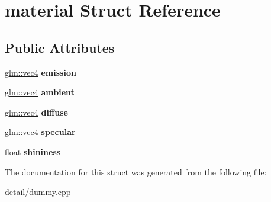 \hypertarget{structmaterial}{\section{material Struct Reference}
\label{structmaterial}
}
\subsection*{Public Attributes}
\begin{DoxyCompactItemize}
\item 
\hypertarget{structmaterial_a76b696726a2ea73e6840001821942bc3}{\hyperlink{group__core__types_ga5881b1b022d7fd1b7218f5916532dd02}{glm\-::vec4} {\bfseries emission}}\label{structmaterial_a76b696726a2ea73e6840001821942bc3}

\item 
\hypertarget{structmaterial_a944296102e90b1610967530458f40ba1}{\hyperlink{group__core__types_ga5881b1b022d7fd1b7218f5916532dd02}{glm\-::vec4} {\bfseries ambient}}\label{structmaterial_a944296102e90b1610967530458f40ba1}

\item 
\hypertarget{structmaterial_a506a0cc33282fa76872c6aeebd688b39}{\hyperlink{group__core__types_ga5881b1b022d7fd1b7218f5916532dd02}{glm\-::vec4} {\bfseries diffuse}}\label{structmaterial_a506a0cc33282fa76872c6aeebd688b39}

\item 
\hypertarget{structmaterial_a452d07b4570da7204caeaf798cd01a77}{\hyperlink{group__core__types_ga5881b1b022d7fd1b7218f5916532dd02}{glm\-::vec4} {\bfseries specular}}\label{structmaterial_a452d07b4570da7204caeaf798cd01a77}

\item 
\hypertarget{structmaterial_aa3740fd7908ec5a11bbc4a4bd5b21abc}{float {\bfseries shininess}}\label{structmaterial_aa3740fd7908ec5a11bbc4a4bd5b21abc}

\end{DoxyCompactItemize}


The documentation for this struct was generated from the following file\-:\begin{DoxyCompactItemize}
\item 
detail/dummy.\-cpp\end{DoxyCompactItemize}
